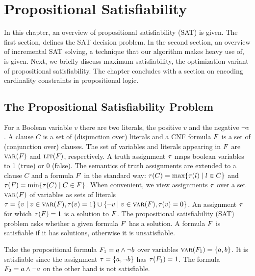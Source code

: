 \chapter{Propositional Satisfiability\label{chap:satisfiability}}

In this chapter, an overview of propositional satisfiability (SAT) is given.
The first section, defines the SAT decision problem.
In the second section, an overview of incremental SAT solving, a technique that our algorithm makes heavy use of, is given.
Next, we briefly discuss maximum satisfiability, the optimization variant of propositional satisfiability.
The chapter concludes with a section on encoding cardinality constraints in propositional logic.

\section{The Propositional Satisfiability Problem\label{sec:sat}}

For a Boolean variable $v$ there are two literals, the positive $v$ and the negative $\lnot v$. 
A clause $C$ is a set of (disjunction over) literals and a CNF formula $F$ is a set of (conjunction over) clauses.
The set of variables and literals appearing in $F$ are $\textsc{var}(F)$ and $\textsc{lit}(F)$, respectively.  
A truth assignment $\tau$ maps boolean variables to 1 (true) or 0 (false).
The semantics of truth assignments are extended to a clause $C$ and a formula $F$ in the standard way: $\tau(C) = \max\{ \tau(l) \mid l \in C\}$ and $\tau(F) = \min\{\tau(C) \mid C \in F\}$.
When convenient, we view assignments $\tau$ over a set $\textsc{var}(F)$ of variables as sets of literals $\tau = \{ v \mid v \in \textsc{var}(F),  \tau(v) = 1\} \cup \{ \lnot v \mid v \in \textsc{var}(F), \tau(v) = 0\}$.
An assignment $\tau$ for which $\tau(F) = 1$ is a solution to $F$.
The propositional satisfiability (SAT) problem asks whether a given formula $F$ has a solution.
A formula $F$ is satisfiable if it has solutions, otherwise it is unsatisfiable.

\begin{example}
  Take the propositional formula $F_1 = a \land \lnot b$ over variables $\textsc{var}(F_1) = \{a,b\}$.
  It is satisfiable since the assignment $\tau=\{a,\lnot b\}$ has $\tau(F_1)=1$.
  The formula $F_2 = a \land \lnot a$ on the other hand is not satisfiable.
\end{example}

